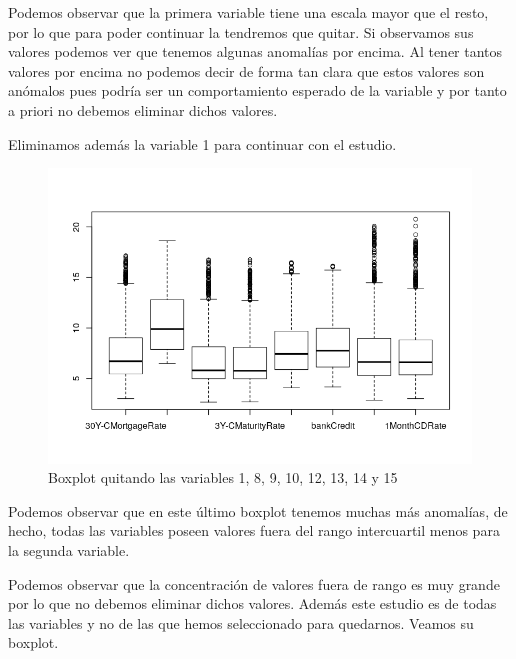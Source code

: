\documentclass[12pt,a4paper]{article}
\begin{document}
Podemos observar que la primera variable tiene una escala mayor que el resto, por lo que para poder continuar la tendremos que quitar. Si observamos sus valores podemos ver que tenemos algunas anomalías por encima. Al tener tantos valores por encima no podemos decir de forma tan clara que estos valores son anómalos pues podría ser un comportamiento esperado de la variable y por tanto a priori no debemos eliminar dichos valores.

Eliminamos además la variable 1 para continuar con el estudio.

\begin{figure}[H]
	\centering
	\includegraphics[scale=0.8]{./Imagenes/EDA/Regresion/boxplot_filtrado2.png}
	\caption{Boxplot quitando las variables 1, 8, 9, 10, 12, 13, 14 y 15}
\end{figure}

Podemos observar que en este último boxplot tenemos muchas más anomalías, de hecho, todas las variables poseen valores fuera del rango intercuartil menos para la segunda variable.

Podemos observar que la concentración de valores fuera de rango es muy grande por lo que no debemos eliminar dichos valores. Además este estudio es de todas las variables y no de las que hemos seleccionado para quedarnos. Veamos su boxplot.
\end{document}
